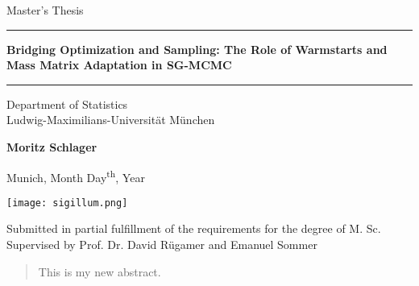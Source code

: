 \documentclass[12pt]{article}
\newcommand{\mytitle}{Bridging Optimization and Sampling: The Role of Warmstarts and Mass Matrix Adaptation in SG-MCMC}
\newcommand{\myname}{Moritz Schlager}
\newcommand{\mysupervisor}{Prof. Dr. David Rügamer and Emanuel Sommer}
\begin{document}

\begin{titlepage}
  \begin{center}

    \LARGE
    Master's Thesis

    \vspace{0.5cm}

    \rule{\textwidth}{1.5pt}
    \LARGE
    \textbf{\mytitle}
    \rule{\textwidth}{1.5pt}

    \vspace{0.5cm}

    \large
    Department of Statistics \\
    Ludwig-Maximilians-Universität München

    \vfill

    \Large
    \textbf{\myname}

    \vfill

    \large
    Munich, Month Day\textsuperscript{th}, Year

    \vfill

    \texttt{[image: sigillum.png]}

    \vfill

    \normalsize
    Submitted in partial fulfillment of the requirements for the degree of M. Sc.
    \\

    Supervised by \mysupervisor

  \end{center}
\end{titlepage}


\newpage

\begin{abstract}

  This is my new abstract.

\end{abstract}

\newpage
\tableofcontents

\newpage
\listoffigures
{}
\newpage
\listoftables
{}
\newpage

\end{document}
